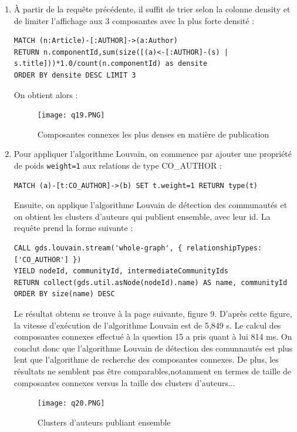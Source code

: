 \documentclass[11pt]{article}
\newcommand{\eb}{\end{bclogo}}
\newcommand{\br}{\begin{bclogo}[margeG=1,noborder=true,nobreak=true]{Remarque}}
\begin{document}
\begin{enumerate}[resume]
\begin{figure}[H]
\end{figure}
\br On multiplie le nombre d'articles publiés par les auteurs de la composante connexe par 1.0 pour que l'on obtienne à la fin un résultat sous forme de flottant et non d'entier (car ce serait alors une division entière). \eb
\item 
À partir de la requête précédente, il suffit de trier selon la colonne density et de limiter l'affichage aux 3 composantes avec la plus forte densité :
\begin{lstlisting}
MATCH (n:Article)-[:AUTHOR]->(a:Author) 
RETURN n.componentId,sum(size([(a)<-[:AUTHOR]-(s) | s.title]))*1.0/count(n.componentId) as densite 
ORDER BY densite DESC LIMIT 3
\end{lstlisting}
On obtient alors :
\begin{figure}[H]
    \centerline{\texttt{[image: q19.PNG]}}
    \caption{Composantes connexes les plus denses en matière de publication}
\end{figure}
\item 
Pour appliquer l'algorithme Louvain, on commence par ajouter une propriété de poids \texttt{weight=1} aux relations de type CO\_AUTHOR :
\begin{lstlisting}
MATCH (a)-[t:CO_AUTHOR]->(b) SET t.weight=1 RETURN type(t)
\end{lstlisting}
Ensuite, on applique l'algorithme Louvain de détection des communautés et on obtient les clusters d'auteurs qui publient ensemble, avec leur id. La requête prend la forme suivante :
\begin{lstlisting}
CALL gds.louvain.stream('whole-graph', { relationshipTypes: ['CO_AUTHOR'] }) 
YIELD nodeId, communityId, intermediateCommunityIds
RETURN collect(gds.util.asNode(nodeId).name) AS name, communityId
ORDER BY size(name) DESC
\end{lstlisting}

Le résultat obtenu se trouve à la page suivante, figure 9. D'après cette figure, la vitesse d'exécution de l'algorithme Louvain est de 5,849 s. Le calcul des composantes connexes effectué à la question 15 a pris quant à lui 814 ms. On conclut donc que l'algorithme Louvain de détection des comunnautés est plus lent que l'algorithme de recherche des composantes connexes. De plus, les résultats ne semblent pas être comparables,notamment en termes de taille de composantes connexes versus la taille des clusters d'auteurs...
\begin{landscape}
\begin{figure}[!p]
    \centerline{\texttt{[image: q20.PNG]}}
    \caption{Clusters d'auteurs publiant ensemble}
\end{figure}
\end{landscape}
\end{enumerate}
\end{document}
